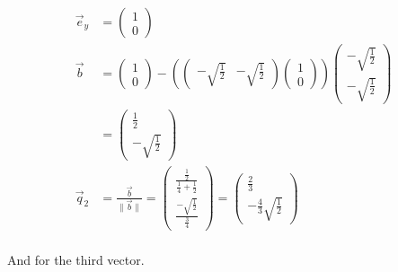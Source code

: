 \documentclass[a4paper]{article}
\begin{document}
\begin{PropositionOpt4}
\begin{displaymath}
\begin{align}
\vec{e}_{y} &= \begin{pmatrix}1\\0\end{pmatrix}\\
	\vec{b} &= \begin{pmatrix}1\\0\end{pmatrix} - 
	(\begin{pmatrix}-\sqrt{\frac12}&-\sqrt{\frac12}\end{pmatrix}
	\begin{pmatrix}1\\0\end{pmatrix})
	\begin{pmatrix}-\sqrt{\frac12}\\-\sqrt{\frac12} \end{pmatrix}\\
	&= \begin{pmatrix}\frac12\\-\sqrt{\frac12}\end{pmatrix}\\
	\vec{q}_{2} &= \frac{\vec{b}}{\|\vec{b}\|}
			= \begin{pmatrix}\frac{\frac12}{\frac14 + \frac12}\\\frac{-\sqrt{\frac12}}{\frac34}\end{pmatrix} 
			= \begin{pmatrix}\frac23\\-\frac43 \sqrt{\frac12}\end{pmatrix}\\    
\end{align}
\end{displaymath}

And for the third vector.\\


\end{PropositionOpt4}
\end{document}
